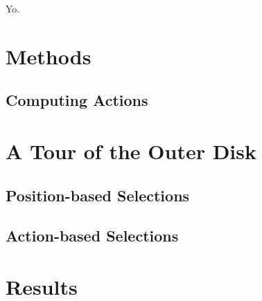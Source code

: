 \documentclass[modern]{aastex63}
\newcommand{\gaia}{\textsl{Gaia}}
\newcommand{\dr}[1]{\acronym{DR}#1}
\begin{document}

Yo.


\section{Methods}
\label{sec:methods}

\subsection{Computing Actions}
\label{sec:est-actions}



\section{A Tour of the Outer Disk}
\label{sec:tour}

\subsection{Position-based Selections}
\label{sec:sel-positions}

\subsection{Action-based Selections}
\label{sec:sel-actions}



\section{Results}
\label{sec:results}
\end{document}

